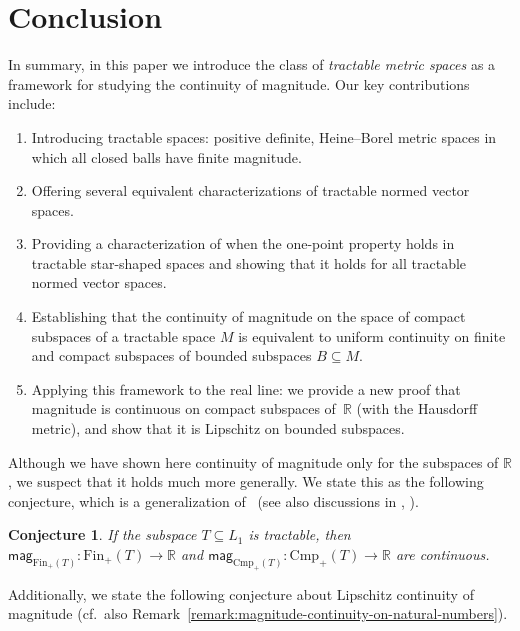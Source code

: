 \documentclass[11pt]{article}
\theoremstyle{plain}
\newtheorem{conjecture}[theorem]{Conjecture}
\theoremstyle{definition}
\newcommand{\RR}{\mathbb{R}}
\newcommand{\mg}[1][]{\mathsf{mag}_{#1}}
\newcommand{\fsub}{\mathrm{Fin}}
\newcommand{\ifsub}{\fsub_{+}}
\newcommand{\csub}{\mathrm{Cmp}}
\newcommand{\icsub}{\csub_{+}}
\begin{document}
\section{Conclusion}\label{section:contribution}


In summary, in this paper we introduce the class of \emph{tractable metric spaces} as a framework for studying the continuity of magnitude. Our key contributions include:

 \begin{enumerate}
  \item Introducing tractable spaces: positive definite, Heine--Borel metric spaces in which all closed balls have finite magnitude.
  \item Offering several equivalent characterizations of tractable normed vector spaces.
  \item Providing a characterization of when the one-point property holds in tractable star-shaped spaces and showing that it holds for all tractable normed vector spaces.
  \item Establishing that the continuity of magnitude on the space of compact subspaces of a tractable space $M$ is equivalent to uniform continuity on finite and compact subspaces of bounded subspaces $B \subseteq M$.
  \item Applying this framework to the real line: we provide a new proof that magnitude is continuous on compact subspaces of~\(\mathbb{R}\) (with the Hausdorff metric), and show that it is Lipschitz on bounded subspaces.
\end{enumerate}


Although we have shown here continuity of magnitude only for the subspaces of $\RR$, we suspect that it holds much more generally. We state this as the following conjecture, which is a generalization of~\cite[Conjecture~1.3]{katsumasa2025magnitudegenericallycontinuousfinite} (see also discussions in \cite{Meckes-volume}, \cite{Meckes_2023}).

\begin{conjecture}\label{conjecture:tractable-magnitude-continuity}
If the subspace $T \subseteq L_1$ is tractable, then $\mg[\ifsub(T)]\colon \ifsub(T) \to \RR$ and $\mg[\icsub(T)]\colon\icsub(T) \to \RR$ are continuous.
\end{conjecture}

Additionally, we state the following conjecture about Lipschitz continuity of magnitude (cf.~also Remark~\ref{remark:magnitude-continuity-on-natural-numbers}).
\end{document}
